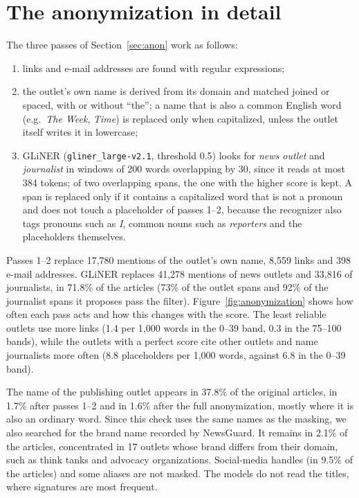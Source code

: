 \documentclass[11pt,a4paper]{article}
\begin{document}
\section{The anonymization in detail}\label{app:anonfig}
The three passes of Section~\ref{sec:anon} work as follows:
\begin{enumerate}
  \item links and e-mail addresses are found with regular expressions;
  \item the outlet's own name is derived from its domain and matched joined or spaced, with or without ``the''; a name
        that is also a common English word (e.g.\ \emph{The Week}, \emph{Time}) is replaced only when capitalized, unless
        the outlet itself writes it in lowercase;
  \item GLiNER (\texttt{gliner\_large-v2.1}, threshold 0.5) looks for \emph{news outlet} and \emph{journalist} in windows
        of 200 words overlapping by 30, since it reads at most 384 tokens; of two overlapping spans, the one with the
        higher score is kept. A span is replaced only if it contains a capitalized word that is not a pronoun and does
        not touch a placeholder of passes 1--2, because the recognizer also tags pronouns such as \emph{I}, common nouns
        such as \emph{reporters} and the placeholders themselves.
\end{enumerate}
Passes 1--2 replace 17,780 mentions of the outlet's own name, 8,559 links and 398 e-mail addresses. GLiNER replaces
41,278 mentions of news outlets and 33,816 of journalists, in 71.8\% of the articles (73\% of the outlet spans and 92\%
of the journalist spans it proposes pass the filter). Figure~\ref{fig:anonymization} shows how often each pass acts and
how this changes with the score. The least reliable outlets use more links (1.4 per 1,000 words in the 0--39 band, 0.3
in the 75--100 bands), while the outlets with a perfect score cite other outlets and name journalists more often (8.8
placeholders per 1,000 words, against 6.8 in the 0--39 band).

The name of the publishing outlet appears in 37.8\% of the original articles, in 1.7\% after passes 1--2 and in 1.6\%
after the full anonymization, mostly where it is also an ordinary word. Since this check uses the same names as the
masking, we also searched for the brand name recorded by NewsGuard. It remains in 2.1\% of the articles, concentrated in
17 outlets whose brand differs from their domain, such as think tanks and advocacy organizations. Social-media handles
(in 9.5\% of the articles) and some aliases are not masked. The models do not read the titles, where signatures are most
frequent.
\end{document}
